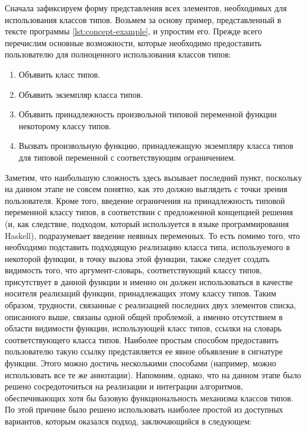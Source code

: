 Сначала зафиксируем форму представления всех элементов, необходимых для использования классов типов. Возьмем за основу пример, представленный в тексте программы \ref{lst:concept-example}, и упростим его. Прежде всего перечислим основные возможности, которые необходимо предоставить пользователю для полноценного использования классов типов:
\begin{enumerate}
    \item Объявить класс типов.
    \item Объявить экземпляр класса типов.
    \item Объявить принадлежность произвольной типовой переменной функции некоторому классу типов.
    \item Вызвать произвольную функцию, принадлежащую экземпляру класса типов для типовой переменной с соответствующим ограничением.   
\end{enumerate}
Заметим, что наибольшую сложность здесь вызывает последний пункт, поскольку на данном этапе не совсем понятно, как это должно выглядеть с точки зрения пользователя. Кроме того, введение ограничения на принадлежность типовой переменной классу типов, в соответствии с предложенной концепцией решения (и, как следствие, подходом, который используется в языке программирования Haskell),  подразумевает введение неявных переменных. То есть помимо того, что необходимо подставить подходящую реализацию класса типа, используемого в некоторой функции, в точку вызова этой функции, также следует создать видимость того, что аргумент-словарь, соответствующий классу типов, присутствует в данной функции и именно он должен использоваться в качестве носителя реализаций функции, принадлежащих этому классу типов. Таким образом, трудности, связанные с реализацией последних двух элементов списка, описанного выше, связаны одной общей проблемой, а именно отсутствием в области видимости функции, использующей класс типов, ссылки на словарь  соответствующего класса типов. Наиболее простым способом предоставить пользователю такую ссылку представляется ее явное объявление в сигнатуре функции. Этого можно достичь несколькими способами (например, можно использовать все те же аннотации). Напомним, однако, что на данном этапе было решено сосредоточиться на реализации и интеграции алгоритмов, обеспечивающих хотя бы базовую функциональность механизма классов типов. По этой причине было решено использовать наиболее простой из доступных вариантов, которым  оказался подход, заключающийся в следующем:
